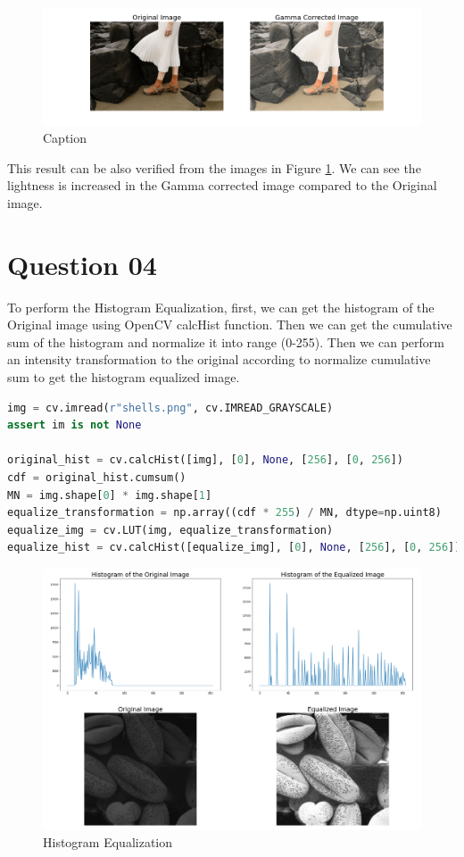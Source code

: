 \documentclass[a4paper]{article}
\begin{document}
\begin{figure}[!htb]
    \centering
    \includegraphics[width=1.1\textwidth]{../q32.png}

    \caption{Caption}
    \label{figq32}
\end{figure}

This result can be also verified from the images in Figure \ref{figq32}.
 We can see the lightness is increased in the 
Gamma corrected image compared to the Original image.

\section*{Question 04}
To perform the Histogram Equalization, first, we can get the histogram of the
 Original image using OpenCV
calcHist function. Then we can get the cumulative sum of the histogram and
 normalize it into range (0-255). Then we can perform an intensity
  transformation to the original according to normalize cumulative sum to get the
  histogram equalized image.\\

\begin{lstlisting}[language=python, caption=Histogram Equalization]
img = cv.imread(r"shells.png", cv.IMREAD_GRAYSCALE)
assert im is not None

original_hist = cv.calcHist([img], [0], None, [256], [0, 256])
cdf = original_hist.cumsum()
MN = img.shape[0] * img.shape[1]
equalize_transformation = np.array((cdf * 255) / MN, dtype=np.uint8)
equalize_img = cv.LUT(img, equalize_transformation)
equalize_hist = cv.calcHist([equalize_img], [0], None, [256], [0, 256])
\end{lstlisting}

\begin{figure}[!htb]
    \centering

    \includegraphics[width=\textwidth]{../q4.png}
    \caption{Histogram Equalization}
    \label{figq4}
\end{figure}
\end{document}
